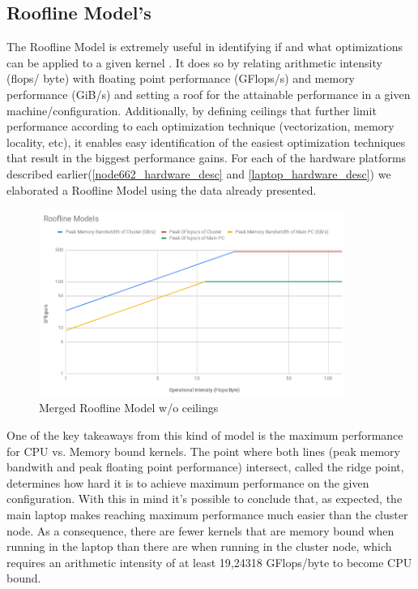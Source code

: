 \documentclass{article}
\begin{document}
\subsection{Roofline Model's}
The Roofline Model is extremely useful in identifying if and what optimizations can be applied to a given kernel \cite{roofline_model}. It does so by relating arithmetic intensity (flops/ byte) with floating point performance 
(GFlops/s) and memory performance (GiB/s) and setting a roof for the attainable performance in a given machine/configuration. 
Additionally, by defining ceilings that further limit performance according to each optimization technique (vectorization, 
memory locality, etc), it enables easy identification of the easiest optimization techniques
that result in the biggest performance gains.
For each of the hardware platforms described earlier(\ref{node662_hardware_desc} and \ref{laptop_hardware_desc}) we 
elaborated a Roofline Model using the data already presented. 
\begin{figure}[H]
    \centering
    \includegraphics[width=10cm]{Pictures/roofline_merge.png}
    \caption{Merged Roofline Model w/o ceilings}
\end{figure}

One of the key takeaways from this kind of model is the maximum performance for CPU vs. Memory bound kernels. The point where both lines (peak memory bandwith
and peak floating point performance) intersect, called the ridge point, determines how hard it is to achieve maximum performance on the given configuration. With this
in mind it's possible to conclude that, as expected, the main laptop makes reaching maximum performance much easier than the cluster node. As a consequence, there
are fewer kernels that are memory bound when running in the laptop than there are when running in the cluster node, which requires an arithmetic intensity of at
least 19,24318 GFlops/byte to become CPU bound.
\end{document}
